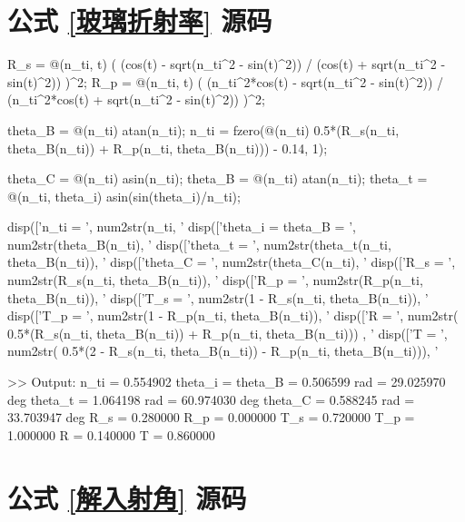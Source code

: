 \documentclass[UTF8]{report}
\theoremstyle{MyLineTheoremStyle} %
\theoremstyle{MyBlockTheoremStyle} %
\theoremstyle{MySubsubsectionStyle} %
\begin{document}
\section{公式 \ref{玻璃折射率} 源码}\label{玻璃折射率源码}

\begin{matlablisting}
R_s = @(n_ti, t) ( (cos(t) - sqrt(n_ti^2 - sin(t)^2)) / (cos(t) + sqrt(n_ti^2 - sin(t)^2)) )^2;
R_p = @(n_ti, t) ( (n_ti^2*cos(t) - sqrt(n_ti^2 - sin(t)^2)) / (n_ti^2*cos(t) + sqrt(n_ti^2 - sin(t)^2)) )^2;

theta_B = @(n_ti) atan(n_ti);
n_ti = fzero(@(n_ti) 0.5*(R_s(n_ti, theta_B(n_ti)) + R_p(n_ti, theta_B(n_ti))) - 0.14, 1);

theta_C = @(n_ti) asin(n_ti);
theta_B = @(n_ti) atan(n_ti);
theta_t = @(n_ti, theta_i) asin(sin(theta_i)/n_ti);

disp(['n_ti = ', num2str(n_ti, '%
disp(['theta_i = theta_B = ', num2str(theta_B(n_ti), '%
disp(['theta_t = ', num2str(theta_t(n_ti, theta_B(n_ti)), '%
disp(['theta_C = ', num2str(theta_C(n_ti), '%
disp(['R_s = ', num2str(R_s(n_ti, theta_B(n_ti)), '%
disp(['R_p = ', num2str(R_p(n_ti, theta_B(n_ti)), '%
disp(['T_s = ', num2str(1 - R_s(n_ti, theta_B(n_ti)), '%
disp(['T_p = ', num2str(1 - R_p(n_ti, theta_B(n_ti)), '%
disp(['R = ', num2str( 0.5*(R_s(n_ti, theta_B(n_ti)) + R_p(n_ti, theta_B(n_ti))) , '%
disp(['T = ', num2str( 0.5*(2 - R_s(n_ti, theta_B(n_ti)) - R_p(n_ti, theta_B(n_ti))), '%


>> Output:
n_ti = 0.554902
theta_i = theta_B = 0.506599 rad = 29.025970 deg
theta_t = 1.064198 rad = 60.974030 deg
theta_C = 0.588245 rad = 33.703947 deg
R_s = 0.280000
R_p = 0.000000
T_s = 0.720000
T_p = 1.000000
R = 0.140000
T = 0.860000
\end{matlablisting}

\section{公式 \ref{解入射角} 源码}\label{公式解入射角源码}
\end{document}

